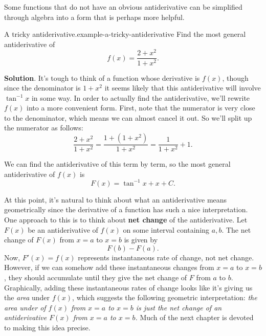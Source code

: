 \documentclass[10pt,]{book}
\newcommand{\terminology}[1]{\textbf{#1}}
\numberwithin{equation}{section}
\begin{document}
\hypertarget{p-396}{}%
Some functions that do not have an obvious antiderivative can be simplified through algebra into a form that is perhaps more helpful.%
\begin{example}{A tricky antiderivative.}{example-a-tricky-antiderivative}%
\hypertarget{p-397}{}%
Find the most general antiderivative of%
\begin{equation*}
f(x) = \frac{2+x^{2}}{1+x^{2}}.
\end{equation*}
%
\par\smallskip%
\noindent\textbf{Solution}.\hypertarget{solution-89}{}\quad%
\hypertarget{p-398}{}%
It's tough to think of a function whose derivative is \(f(x)\), though since the denominator is \(1+x^{2}\) it seems likely that this antiderivative will involve \(\tan^{-1}x\) in some way. In order to actually find the antiderivative, we'll rewrite \(f(x)\) into a more convenient form. First, note that the numerator is very close to the denominator, which means we can almost cancel it out. So we'll split up the numerator as follows:%
\begin{equation*}
\frac{2+x^{2}}{1+x^{2}} = \frac{1+(1+x^{2})}{1+x^{2}} = \frac{1}{1+x^{2}} + 1.
\end{equation*}
%
\par
\hypertarget{p-399}{}%
We can find the antiderivative of this term by term, so the most general antiderivative of \(f(x)\) is%
\begin{equation*}
F(x) = \tan^{-1}x + x + C.
\end{equation*}
%
\end{example}
\hypertarget{p-400}{}%
At this point, it's natural to think about what an antiderivative means geometrically since the derivative of a function has such a nice interpretation. One approach to this is to think about \terminology{net change} of the antiderivative. Let \(F(x)\) be an antiderivative of \(f(x)\) on some interval containing \(a,b\). The net change of \(F(x)\) from \(x=a\) to \(x=b\) is given by%
\begin{equation*}
F(b) - F(a).
\end{equation*}
Now, \(F'(x) = f(x)\) represents instantaneous rate of change, not net change. However, if we can somehow add these instantaneous changes from \(x=a\) to \(x=b\), they should accumulate until they give the net change of \(F\) from \(a\) to \(b\). Graphically, adding these instantaneous rates of change looks like it's giving us the \emph{area} under \(f(x)\), which suggests the following geometric interpretation: \emph{the area under of \(f(x)\) from \(x=a\) to \(x=b\) is just the net change of an antiderivative \(F(x)\) from \(x=a\) to \(x=b\).} Much of the next chapter is devoted to making this idea precise.%
%
%
\typeout{************************************************}
\typeout{************************************************}
%
\end{document}
